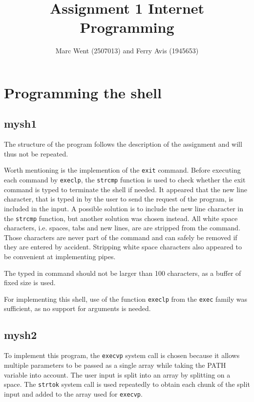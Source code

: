 \documentclass[11pt]{article}
\title{Assignment 1 Internet Programming}
\author{Marc Went (2507013) and Ferry Avis (1945653)}
\begin{document}
\maketitle

\section{Programming the shell}

\subsection{mysh1}

The structure of the program follows the description of the assignment and will thus not be repeated.

Worth mentioning is the implemention of the \texttt{exit} command. Before executing each command by \texttt{execlp}, the \texttt{strcmp} function is used to check whether the exit command is typed to terminate the shell if needed. It appeared that the new line character, that is typed in by the user to send the request of the program, is included in the input. A possible solution is to include the new line character in the \texttt{strcmp} function, but another solution was chosen instead. All white space characters, i.e. spaces, tabs and new lines, are are stripped from the command. Those characters are never part of the command and can safely be removed if they are entered by accident. Stripping white space characters also appeared to be convenient at implementing pipes.

The typed in command should not be larger than 100 characters, as a buffer of fixed size is used.

For implementing this shell, use of the function \texttt{execlp} from the \texttt{exec} family was sufficient, as no support for arguments is needed.

\subsection{mysh2}

To implement this program, the \texttt{execvp} system call is chosen because it allows multiple parameters to be passed as a single array while taking the PATH variable into account. The user input is split into an array by splitting on a space. The \texttt{strtok} system call is used repeatedly to obtain each chunk of the split input and added to the array used for \texttt{execvp}.
\end{document}
